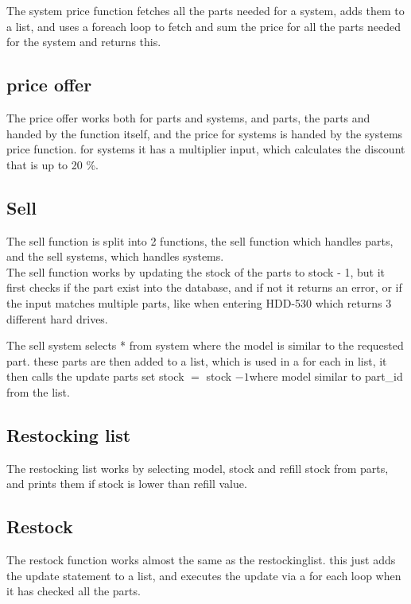 \documentclass[a4paper,10pt,titlepage]{report}
\begin{document}


The system price function fetches all the parts needed for a system, adds them to a list, and uses a foreach loop to fetch and sum the price for all the parts needed for the system and returns this.

\subsection{price offer}
The price offer works both for parts and systems, and parts, the parts and handed by the function itself, and the price for systems is handed by the systems price function. for systems it has a multiplier input, which calculates the discount that is up to 20 \%.

\subsection{Sell}
The sell function is split into 2 functions, the sell function which handles parts, and the sell systems, which handles systems.
\\ \vspace{5 mm}
The sell function works by updating the stock of the parts to stock - 1, but it first checks if the part exist into the database, and if not it returns an error, or if the input matches multiple parts, like when entering HDD-530 which returns 3 different hard drives. 

\vspace{5 mm}
The sell system selects * from system where the model is similar to the requested part.
these parts are then added to a list, which is used in a for each in list, it then calls the update parts set stock $=$ stock $-1 $where model similar to part\_id from the list. 

\subsection{Restocking list}
The restocking list works by selecting model, stock and refill stock from parts, and prints them if stock is lower than refill value.

\subsection{Restock}
The restock function works almost the same as the restockinglist. this just adds the update statement to a list, and executes the update via a for each loop when it has checked all the parts.

\end{document}
